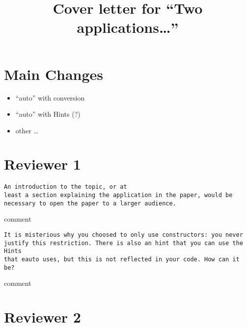 \documentclass{article}
\begin{document}
\title{Cover letter for ``Two applications\dots''}
\maketitle{}

\section*{Main Changes}

\begin{itemize}
\item ``auto'' with conversion
\item ``auto'' with Hints (?)
\item other \dots
\end{itemize}
\section*{Reviewer 1}
\begin{verbatim}
An introduction to the topic, or at
least a section explaining the application in the paper, would be
necessary to open the paper to a larger audience.
\end{verbatim}
comment
\begin{verbatim}
It is misterious why you choosed to only use constructors: you never
justify this restriction. There is also an hint that you can use the Hints
that eauto uses, but this is not reflected in your code. How can it be?
\end{verbatim}
comment
\section*{Reviewer 2}
\end{document}
